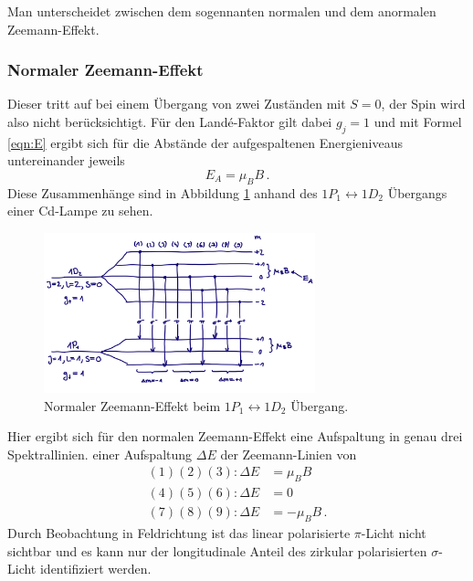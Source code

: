             Man unterscheidet zwischen dem sogennanten normalen und dem anormalen Zeemann-Effekt.
            \subsubsection{Normaler Zeemann-Effekt}
                Dieser tritt auf bei einem Übergang von zwei Zuständen mit $S=0$, der Spin wird also nicht berücksichtigt.
                Für den Landé-Faktor gilt dabei $g_j=1$ und mit Formel \ref{eqn:E}
                ergibt sich für die Abstände der aufgespaltenen Energieniveaus untereinander jeweils
                \begin{equation}
                    E_A= \mu_BB \, .
                \end{equation}
                Diese Zusammenhänge sind in Abbildung \ref{fig:NZ} anhand des $1P_1\leftrightarrow 1D_2$ Übergangs einer Cd-Lampe zu sehen.
                \begin{figure}[h]
                    \centering
                    \includegraphics[width = 0.7\textwidth]{pictures/normal.png}
                    \caption{Normaler Zeemann-Effekt beim $1P_1\leftrightarrow 1D_2$ Übergang.}
                    \label{fig:NZ}
                \end{figure}
                Hier ergibt sich für den normalen Zeemann-Effekt eine Aufspaltung in genau drei Spektrallinien.
                einer Aufspaltung $\Delta E$ der Zeemann-Linien von
                \begin{align}
                    (1)(2)(3): \Delta E&=\mu_BB \\
                    (4)(5)(6): \Delta E&=0 \\
                    (7)(8)(9): \Delta E&=-\mu_BB \, .
                \end{align}
                Durch Beobachtung in Feldrichtung ist das linear polarisierte $\pi$-Licht nicht sichtbar und es
                kann nur der longitudinale Anteil des zirkular polarisierten $\sigma$-Licht identifiziert werden.
